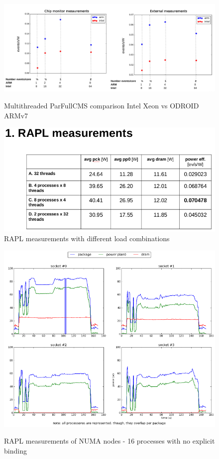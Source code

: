 \begin{figure}[h!]
  \centering
    \includegraphics[width=150mm]{"img/acat/results1"}
    \label{fig:nf_ss}
    \caption{Multithreaded ParFullCMS comparison Intel Xeon vs ODROID ARMv7}
\end{figure}

\begin{figure}[h!]
  \centering
    \includegraphics[width=150mm]{"img/cern/rapl"}
    \caption{RAPL measurements with different load combinations }
    \label{fig:nf_ss}
\end{figure}


\begin{figure}[h!]
  \centering
    \includegraphics[width=150mm]{"img/numa/16proc_no_binding"}
    \label{fig:nf_ss}
    \caption{RAPL measurements of NUMA nodes - 16 processes with no explicit
binding}
\end{figure}


